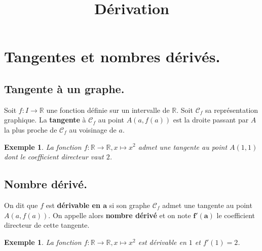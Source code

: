 \documentclass[a4paper,11pt]{article}
\title{Dérivation}
\author{}
\date{}
\newcommand{\R}{\mathbb{R}}
\theoremstyle{break}
\newcounter{enonce}
\newtheorem{exemple}[enonce]{Exemple}
\begin{document}
 
  \maketitle


  
  \section{Tangentes et nombres dérivés.}
  
  \subsection{Tangente à un graphe.}
 
  
  \begin{definition}    
    Soit $f:I \to \R$ une fonction définie sur un intervalle de $\R$. Soit $\mathcal{C}_f$ sa 
    représentation graphique.
    La \textbf{tangente} à $\mathcal{C}_f$ au point $A(a,f(a))$ est la droite passant par $A$ 
    la plus proche de $\mathcal{C}_f$ au voisinage de $a$.
  \end{definition}
  
   \begin{exemple}
   
   La fonction $f:\R \to \R, x \mapsto x^2$ admet une tangente au point $A(1,1)$ dont le coefficient
   directeur vaut $2$.
   
  \end{exemple}

  \subsection{Nombre dérivé.} 
    
  \begin{definition}
  On dit que $f$ est \textbf{dérivable en $\mathbf{a}$} si son graphe $\mathcal{C}_f$ admet une tangente au point 
  $A(a,f(a))$. On appelle alors \textbf{nombre dérivé} et on note $\mathbf{f'(a)}$ le coefficient directeur
  de cette tangente.
  \end{definition}
  
   \begin{exemple}
   
   La fonction $f:\R \to \R, x \mapsto x^2$  est dérivable en $1$ et $f'(1)=2$.
   
  \end{exemple}
  
\end{document}
